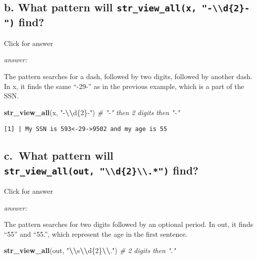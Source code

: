 \documentclass[
]{book}
\newenvironment{Shaded}{\begin{snugshade}}{\end{snugshade}}
\newcommand{\CommentTok}[1]{\textcolor[rgb]{0.56,0.35,0.01}{\textit{#1}}}
\newcommand{\FunctionTok}[1]{\textcolor[rgb]{0.13,0.29,0.53}{\textbf{#1}}}
\newcommand{\NormalTok}[1]{#1}
\newcommand{\SpecialCharTok}[1]{\textcolor[rgb]{0.81,0.36,0.00}{\textbf{#1}}}
\newcommand{\StringTok}[1]{\textcolor[rgb]{0.31,0.60,0.02}{#1}}
\begin{document}
\hypertarget{b.-what-pattern-will-str_view_allx--d2--find}{%
\subsection{\texorpdfstring{b. What pattern will \texttt{str\_view\_all(x,\ "-\textbackslash{}\textbackslash{}d\{2\}-")} find?}{b. What pattern will str\_view\_all(x, "-\textbackslash\textbackslash d\{2\}-") find?}}\label{b.-what-pattern-will-str_view_allx--d2--find}}

Click for answer

\emph{answer:}

The pattern searches for a dash, followed by two digits, followed by another dash. In x, it finds the same ``-29-'' as in the previous example, which is a part of the SSN.

\begin{Shaded}
\begin{Highlighting}[]
\FunctionTok{str\_view\_all}\NormalTok{(x, }\StringTok{"{-}}\SpecialCharTok{\textbackslash{}\textbackslash{}}\StringTok{d\{2\}{-}"}\NormalTok{)  }\CommentTok{\# "{-}" then 2 digits then "{-}"}
\end{Highlighting}
\end{Shaded}

\begin{verbatim}
[1] | My SSN is 593<-29->9502 and my age is 55
\end{verbatim}

\hypertarget{c.-what-pattern-will-str_view_allout-d2.-find}{%
\subsection{\texorpdfstring{c.~What pattern will \texttt{str\_view\_all(out,\ "\textbackslash{}\textbackslash{}d\{2\}\textbackslash{}\textbackslash{}.*")} find?}{c.~What pattern will str\_view\_all(out, "\textbackslash\textbackslash d\{2\}\textbackslash\textbackslash.*") find?}}\label{c.-what-pattern-will-str_view_allout-d2.-find}}

Click for answer

\emph{answer:}

The pattern searches for two digits followed by an optional period. In out, it finds ``55'' and ``55.'', which represent the age in the first sentence.

\begin{Shaded}
\begin{Highlighting}[]
\FunctionTok{str\_view\_all}\NormalTok{(out, }\StringTok{"}\SpecialCharTok{\textbackslash{}\textbackslash{}}\StringTok{s}\SpecialCharTok{\textbackslash{}\textbackslash{}}\StringTok{d\{2\}}\SpecialCharTok{\textbackslash{}\textbackslash{}}\StringTok{."}\NormalTok{)  }\CommentTok{\# 2 digits then "."}
\end{Highlighting}
\end{Shaded}
\end{document}
